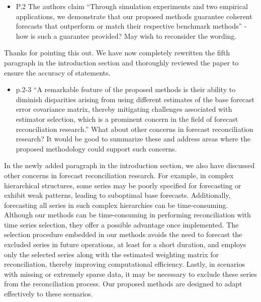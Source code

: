 \documentclass[11pt,a4paper,]{article}
\providecommand{\tightlist}{%
  \setlength{\itemsep}{0pt}\setlength{\parskip}{0pt}}
\renewenvironment{quote}
               {\list{}{\rightmargin\leftmargin}%
                \item\relax\color[RGB]{0,150,0}}
               {\endlist}
\begin{document}
\begin{itemize}
\tightlist
\item
  P.2 The authors claim ``Through simulation experiments and two
  empirical applications, we demonstrate that our proposed methods
  guarantee coherent forecasts that outperform or match their respective
  benchmark methods'' - how is such a guarantee provided? May wish to
  reconsider the wording.
\end{itemize}

\begin{quote}
Thanks for pointing this out. We have now completely rewritten the fifth
paragraph in the introduction section and thoroughly reviewed the paper
to ensure the accuracy of statements.
\end{quote}

\begin{itemize}
\tightlist
\item
  p.2-3 ``A remarkable feature of the proposed methods is their ability
  to diminish disparities arising from using different estimates of the
  base forecast error covariance matrix, thereby mitigating challenges
  associated with estimator selection, which is a prominent concern in
  the field of forecast reconciliation research.'' What about other
  concerns in forecast reconciliation research? It would be good to
  summarize these and address areas where the proposed methodology could
  support such concerns.
\end{itemize}

\begin{quote}
In the newly added paragraph in the introduction section, we also have
discussed other concerns in forecast reconciliation research. For
example, in complex hierarchical structures, some series may be poorly
specified for forecasting or exhibit weak patterns, leading to
suboptimal base forecasts. Additionally, forecasting all series in such
complex hierarchies can be time-consuming. Although our methods can be
time-consuming in performing reconciliation with time series selection,
they offer a possible advantage once implemented. The selection
procedure embedded in our methods avoids the need to forecast the
excluded series in future operations, at least for a short duration, and
employs only the selected series along with the estimated weighting
matrix for reconciliation, thereby improving computational
efficiency.
Lastly, in scenarios with missing or extremely sparse data, it may be
necessary to exclude these series from the reconciliation process. Our
proposed methods are designed to adapt effectively to these scenarios.
\end{quote}
\end{document}
